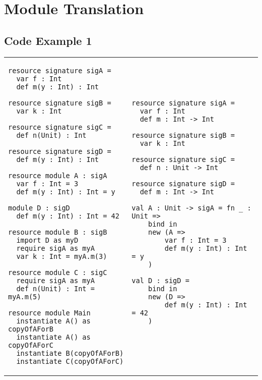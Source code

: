 \documentclass{llncs}
\begin{document}
\newpage

\section{Module Translation}

\subsection{Code Example 1}

\begin{tabular}{p{}p{}}
\begin{minipage}[t]{\textwidth}
\begin{lstlisting}
resource signature sigA =
  var f : Int
  def m(y : Int) : Int

resource signature sigB =
  var k : Int

resource signature sigC =
  def n(Unit) : Int

resource signature sigD =
  def m(y : Int) : Int

resource module A : sigA
  var f : Int = 3
  def m(y : Int) : Int = y

module D : sigD
  def m(y : Int) : Int = 42

resource module B : sigB
  import D as myD
  require sigA as myA
  var k : Int = myA.m(3)

resource module C : sigC
  require sigA as myA
  def n(Unit) : Int = myA.m(5)

resource module Main
  instantiate A() as copyOfAForB 
  instantiate A() as copyOfAForC 
  instantiate B(copyOfAForB)
  instantiate C(copyOfAForC)

\end{lstlisting}
\end{minipage}
&
\hspace{-10ex}
\begin{minipage}[t]{\textwidth}
\begin{lstlisting}
resource signature sigA =
  var f : Int
  def m : Int -> Int

resource signature sigB =
  var k : Int

resource signature sigC =
  def n : Unit -> Int

resource signature sigD =
  def m : Int -> Int
  
val A : Unit -> sigA = fn _ : Unit =>
    bind in
    new (A =>
        var f : Int = 3
        def m(y : Int) : Int = y
    )
    
val D : sigD =
    bind in
    new (D =>
        def m(y : Int) : Int = 42
    )


\end{lstlisting}
\end{minipage}
\end{tabular}
\end{document}
